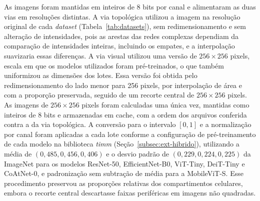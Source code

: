 \begin{table}[htb]
\centering
\caption{Resumo dos \textit{datasets} utilizados.}
\label{tab:datasets}
\small
{}
\end{table}

As imagens foram mantidas em inteiros de 8 bits por canal e alimentaram as duas vias em resoluções distintas. A via topológica utilizou a imagem na resolução original de cada \textit{dataset} (Tabela~\ref{tab:datasets}), sem redimensionamento e sem alteração de intensidades, pois as arestas das redes complexas dependiam da comparação de intensidades inteiras, incluindo os empates, e a interpolação suavizaria essas diferenças. A via visual utilizou uma versão de $256 \times 256$ pixels, escala em que os modelos utilizados foram pré-treinados, o que também uniformizou as dimensões dos lotes. Essa versão foi obtida pelo redimensionamento do lado menor para 256 pixels, por interpolação de área e com a proporção preservada, seguido de um recorte central de $256 \times 256$ pixels. As imagens de $256 \times 256$ pixels foram calculadas uma única vez, mantidas como inteiros de 8 bits e armazenadas em cache, com a ordem dos arquivos conferida contra a da via topológica. A conversão para o intervalo $[0,1]$ e a normalização por canal foram aplicadas a cada lote conforme a configuração de pré-treinamento de cada modelo na biblioteca \textit{timm} (Seção~\ref{subsec:ext-hibrido}), utilizando a média de $(0{,}485, 0{,}456, 0{,}406)$ e o desvio padrão de $(0{,}229, 0{,}224, 0{,}225)$ da ImageNet para os modelos ResNet-50, EfficientNet-B0, ViT-Tiny, DeiT-Tiny e CoAtNet-0, e padronização sem subtração de média para a MobileViT-S. Esse procedimento preservou as proporções relativas dos compartimentos celulares, embora o recorte central descartasse faixas periféricas em imagens não quadradas.

